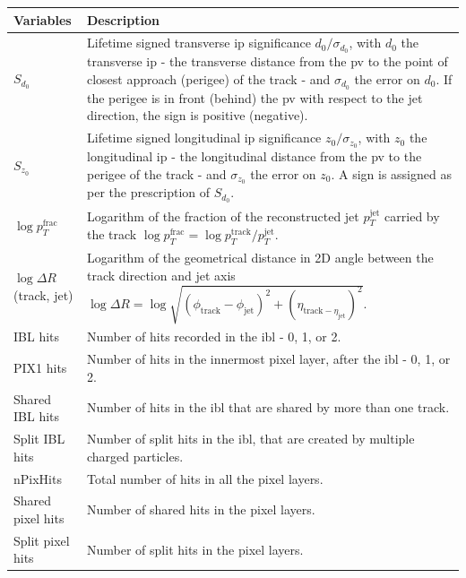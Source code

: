 \begin{table}[h]
  \begin{center}
      \begin{tabular}{C{3cm}|C{13cm}} 
      	 \hline \hline
          Variables & Description  \\ \hline
          $S_{d_0}$      & Lifetime signed transverse \gls{ip} significance $d_0 / \sigma_{d_0}$, with $d_0$ the transverse \gls{ip} - the transverse distance from the \gls{pv} to the point of closest approach (perigee) of the track - and $\sigma_{d_0}$ the error on $d_0$. If the perigee is in front (behind) the \gls{pv} with respect to the jet direction, the sign is positive (negative). \\ \hline
          $S_{z_0}$      & Lifetime signed longitudinal \gls{ip} significance $z_0 / \sigma_{z_0}$, with $z_0$ the longitudinal \gls{ip} - the longitudinal distance from the \gls{pv} to the perigee of the track - and $\sigma_{z_0}$ the error on $z_0$. A sign is assigned as per the prescription of $S_{d_0}$. \\ \hline
          $\log p_T^{\textrm{frac}}$   & Logarithm of the fraction of the reconstructed jet $p_T^{\textrm{jet}}$ carried by the track $\log p_T^{\textrm{frac}} = \log p_T^{\textrm{track}} / p_T^{\textrm{jet}}$. \\ \hline
          $\log \Delta R$(track, jet) & Logarithm of the geometrical distance in 2D angle between the track direction and jet axis $\log \Delta R = \log \sqrt{(\phi_{\textrm{track}} - \phi_{\textrm{jet}})^2 + (\eta_{\textrm{track} - \eta_{\textrm{jet}}})^2}$. \\ \hline
          IBL hits      & Number of hits recorded in the \gls{ibl} - 0, 1, or 2. \\ \hline
          PIX1 hits       & Number of hits in the innermost pixel layer, after the \gls{ibl} - 0, 1, or 2.  \\ \hline
          Shared IBL hits & Number of hits in the \gls{ibl} that are shared by more than one track. \\ \hline
          Split IBL hits  & Number of split hits in the \gls{ibl}, that are created by multiple charged particles. \\ \hline
          nPixHits        & Total number of hits in all the pixel layers.\\ \hline
          Shared pixel hits & Number of shared hits in the pixel layers.\\ \hline
          Split pixel hits  & Number of split hits in the pixel layers.\\ \hline

\end{tabular}
\end{center}
\end{table}

